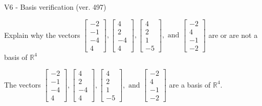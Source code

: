 \begin{exercise}
  \begin{exerciseTitle}V6 - Basis verification (ver. 497)\end{exerciseTitle}
  \begin{exerciseStatement}
    Explain why the vectors \(\left[\begin{array}{r}
-2 \\
-1 \\
-4 \\
4
\end{array}\right] , \left[\begin{array}{r}
4 \\
2 \\
-4 \\
4
\end{array}\right] , \left[\begin{array}{r}
4 \\
2 \\
1 \\
-5
\end{array}\right] , \text{ and } \left[\begin{array}{r}
-2 \\
4 \\
-1 \\
-2
\end{array}\right]\) are or are not a basis of \(\mathbb{R}^4\)	


  \end{exerciseStatement}
  \begin{exerciseAnswer}
   The vectors \(\left[\begin{array}{r}
-2 \\
-1 \\
-4 \\
4
\end{array}\right] , \left[\begin{array}{r}
4 \\
2 \\
-4 \\
4
\end{array}\right] , \left[\begin{array}{r}
4 \\
2 \\
1 \\
-5
\end{array}\right] , \text{ and } \left[\begin{array}{r}
-2 \\
4 \\
-1 \\
-2
\end{array}\right]\) 
  	 are  a basis of \(\mathbb{R}^4\).
  


  \end{exerciseAnswer}
\end{exercise}